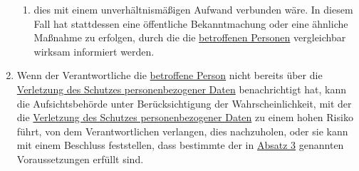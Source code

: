\begin{enumerate}
\begin{enumerate}
    \item dies mit einem unverhältnismäßigen Aufwand verbunden wäre. In diesem Fall hat stattdessen eine öffentliche
     Bekanntmachung oder eine ähnliche Maßnahme zu erfolgen, durch die die \hyperref[itm:04-1]{betroffenen Personen} vergleichbar wirksam
     informiert werden.
    \label{itm:34-3c}

  \end{enumerate}

  \item Wenn der Verantwortliche die \hyperref[itm:04-1]{betroffene Person} nicht bereits über die \hyperref[itm:04-12]{Verletzung des Schutzes personenbezogener
   Daten} benachrichtigt hat, kann die Aufsichtsbehörde unter Berücksichtigung der Wahrscheinlichkeit, mit der die
   \hyperref[itm:04-12]{Verletzung des Schutzes personenbezogener Daten} zu einem hohen Risiko führt, von dem Verantwortlichen verlangen,
   dies nachzuholen, oder sie kann mit einem Beschluss feststellen, dass bestimmte der in \hyperref[itm:34-3]{Absatz 3}
   genannten Voraussetzungen erfüllt sind.
  \label{itm:34-4}

\end{enumerate}


